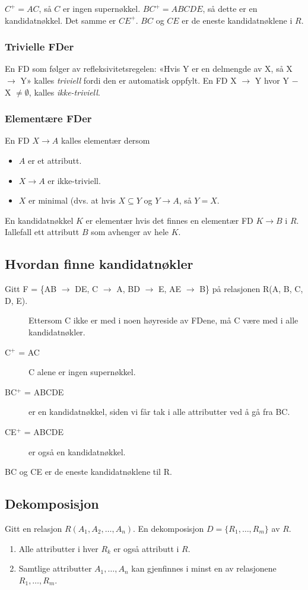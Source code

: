 \documentclass[12pt,a4paper]{article}
\begin{document}
$C^{+} = AC$, så $C$ er ingen supernøkkel.
$BC^{+} = ABCDE$, så dette er en kandidatnøkkel. Det samme er $CE^{+}$. $BC$ og $CE$ er de eneste kandidatnøklene i $R$.

\subsubsection{Trivielle FDer}
En FD som følger av refleksivitetsregelen: «Hvis Y er en delmengde av X, så X $\rightarrow$ Y» kalles \textit{triviell} fordi den er automatisk oppfylt. En FD X $\rightarrow$ Y hvor Y $-$ X $\neq \emptyset$, kalles \textit{ikke-triviell}. 

\subsubsection{Elementære FDer}
En FD $X \rightarrow A$ kalles elementær dersom
\begin{itemize}
\item{$A$ er et attributt.}
\item{$X \rightarrow A$ er ikke-triviell.}
\item{$X$ er minimal (dvs. at hvis $X \subseteq Y$ og $Y \rightarrow A$, så $Y = X$.}
\end{itemize}

En kandidatnøkkel $K$ er elementær hvis det finnes en elementær FD $K \rightarrow B$ i $R$. Iallefall ett attributt $B$ som avhenger av hele $K$.

\subsection{Hvordan finne kandidatnøkler}
Gitt F = \{AB $\rightarrow$ DE, C $\rightarrow$ A, BD $\rightarrow$ E, AE $\rightarrow$ B\} på relasjonen R(A, B, C, D, E).
\begin{description}
\item[] Ettersom C ikke er med i noen høyreside av FDene, må C være med i alle kandidatnøkler.
\item[C$^+$ = AC] C alene er ingen supernøkkel.
\item[BC$^+$ = ABCDE] er en kandidatnøkkel, siden vi får tak i alle attributter ved å gå fra BC.
\item[CE$^+$ = ABCDE] er også en kandidatnøkkel.
\end{description}

BC og CE er de eneste kandidatnøklene til R.

\subsection{Dekomposisjon}
Gitt en relasjon $R(A_1, A_2, \ldots, A_n)$. En dekomposisjon $D = \{R_1, \ldots, R_m\}$ av $R$. 
\begin{enumerate}
\item{Alle attributter i hver $R_k$ er også attributt i $R$.}
\item{Samtlige attributter $A_1, \ldots, A_n$ kan gjenfinnes i minst en av relasjonene $R_1, \ldots, R_m$.}
\end{enumerate}
\end{document}
